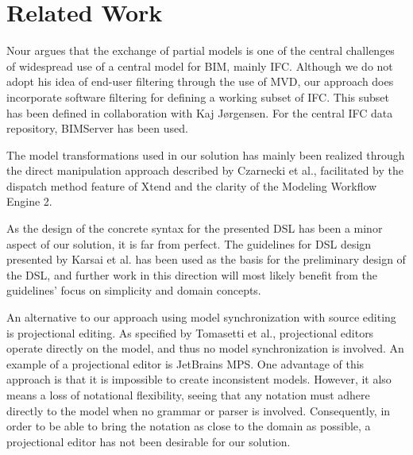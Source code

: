 \section{Related Work}
Nour argues that the exchange of partial models is one of the central challenges of widespread use of a central model for BIM, mainly IFC\cite{nour08}. Although we do not adopt his idea of end-user filtering through the use of MVD, our approach does incorporate software filtering for defining a working subset of IFC. This subset has been defined in collaboration with Kaj J\o rgensen. For the central IFC data repository, BIMServer has been used\cite{beetz10}.

The model transformations used in our solution has mainly been realized through the direct manipulation approach described by Czarnecki et al.\cite{czarnecki06}, facilitated by the dispatch method feature of Xtend and the clarity of the Modeling Workflow Engine 2.

As the design of the concrete syntax for the presented DSL has been a minor aspect of our solution, it is far from perfect. The guidelines for DSL design presented by Karsai et al. \cite{karsai09} has been used as the basis for the preliminary design of the DSL, and further work in this direction will most likely benefit from the guidelines' focus on simplicity and domain concepts.



An alternative to our approach using model synchronization with source editing is projectional editing. As specified by Tomasetti et al.\cite{tomasetti11}, projectional editors operate directly on the model, and thus no model synchronization is involved. An example of a projectional editor is JetBrains MPS. One advantage of this approach is that it is impossible to create inconsistent models. However, it also means a loss of notational flexibility, seeing that any notation must adhere directly to the model when no grammar or parser is involved\cite{conf/models/Voelter10}. Consequently, in order to be able to bring the notation as close to the domain as possible, a projectional editor has not been desirable for our solution.







